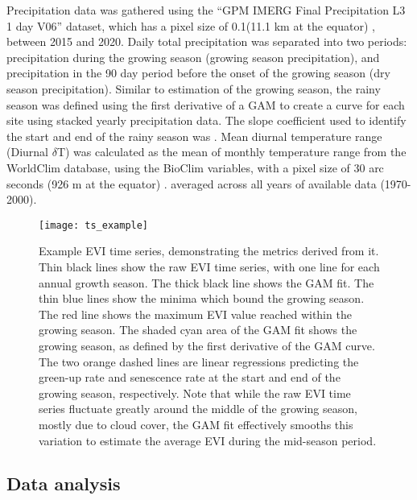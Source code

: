 \documentclass[11pt,a4paper]{article}
\begin{document}
Precipitation data was gathered using the ``GPM IMERG Final Precipitation L3 1 day V06'' dataset, which has a pixel size of 0.1\textdegree (11.1 km at the equator) \citep{GPM}, between 2015 and 2020. Daily total precipitation was separated into two periods: precipitation during the growing season (growing season precipitation), and precipitation in the 90 day period before the onset of the growing season (dry season precipitation). Similar to estimation of the growing season, the rainy season was defined using the first derivative of a GAM to create a curve for each site using stacked yearly precipitation data. The slope coefficient used to identify the start and end of the rainy season was \trmmSLC{}. Mean diurnal temperature range (Diurnal $\delta$T) was calculated as the mean of monthly temperature range from the WorldClim database, using the BioClim variables, with a pixel size of 30 arc seconds (926 m at the equator) \citep{Fick2017}. averaged across all years of available data (1970-2000).

\begin{figure}[H]
\centering
	\texttt{[image: ts\_example]}
	\caption{Example EVI time series, demonstrating the metrics derived from it. Thin black lines show the raw EVI time series, with one line for each annual growth season. The thick black line shows the GAM fit. The thin blue lines show the minima which bound the growing season. The red line shows the maximum EVI value reached within the growing season. The shaded cyan area of the GAM fit shows the growing season, as defined by the first derivative of the GAM curve. The two orange dashed lines are linear regressions predicting the green-up rate and senescence rate at the start and end of the growing season, respectively. Note that while the raw EVI time series fluctuate greatly around the middle of the growing season, mostly due to cloud cover, the GAM fit effectively smooths this variation to estimate the average EVI during the mid-season period.}
	\label{ts_example}
\end{figure}

\subsection{Data analysis}
\end{document}
